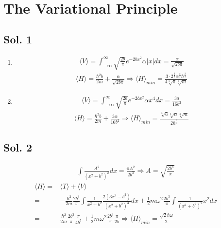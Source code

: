 \section{The Variational Principle}
\subsection*{Sol. 1}
\begin{enumerate}
    \item 
    \begin{align*}
        \langle V\rangle
        =\int_{-\infty}^\infty 
        \sqrt{\frac{2b}{\pi}}
        e^{-2bx^2}
            \alpha |x|
        dx = \frac{\alpha}{\sqrt{2b\pi}}
    \end{align*}    
    \begin{align*}
        \langle H\rangle = \frac{\hbar^2 b}{2m} + \frac{\alpha}{\sqrt{2b\pi}}\Rightarrow 
        \langle H\rangle_{min}=\frac{3 \cdot 2^{\frac{2}{3}} \alpha^{\frac{2}{3}} \hbar^{\frac{2}{3}}}{4 \sqrt[3]{\pi} \sqrt[3]{m}}
    \end{align*}
    \item 
     \begin{align*}
        \langle V\rangle
        =\int_{-\infty}^\infty 
        \sqrt{\frac{2b}{\pi}}
        e^{-2bx^2}
            \alpha x^4
        dx = \frac{3a}{16b^2}
    \end{align*}    
    \begin{align*}
        \langle H\rangle = \frac{\hbar^2 b}{2m} + \frac{3\alpha}{16b^2}\Rightarrow 
        \langle H\rangle_{min}=
        \frac{\sqrt[3]{6} \sqrt[3]{\alpha} \sqrt[3]{m}}{2 \hbar^{\frac{2}{3}}}
    \end{align*}
\end{enumerate}
\subsection*{Sol. 2}
\begin{align*}
    \int \frac{A^2}{(x^2+b^2)^2}dx = \frac{\pi A^2}{2b^3}\Rightarrow A = \sqrt{\frac{2b^3}{\pi}}
\end{align*}
\begin{align*}
    \langle H\rangle 
     =& \langle T \rangle + \langle V\rangle\\
     =&
     -\frac{\hbar^2}{2m}
     \frac{2b^3}{\pi}
     \int \frac{1}{x^2+b^2}\frac{2 \left(3x^{2} - b^{2}\right)}{\left(x^{2} + b^{2}\right)^{3}}
     dx
     +
     \frac{1}{2}m\omega^2 
     \frac{2b^3}{\pi}\int \frac{1}{(x^2+b^2)^2}x^2dx\\
     =& 
     \frac{\hbar^2}{2m}
     \frac{2b^3}{\pi}\frac{\pi}{4b^5}
     + \frac{1}{2}m\omega^2 
     \frac{2b^3}{\pi}\frac{\pi}{2b}
     \Rightarrow \langle H\rangle_{min} = \frac{\sqrt{2} \hbar \omega}{2}
\end{align*}



